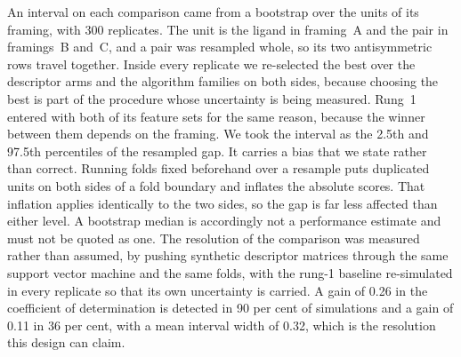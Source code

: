 An interval on each comparison came from a bootstrap over the units of its framing,
with 300 replicates. The unit is the ligand in framing~A and the pair in framings~B
and~C, and a pair was resampled whole, so its two antisymmetric rows travel together.
Inside every replicate we re-selected the best over the descriptor arms and the
algorithm families on both sides, because choosing the best is part of the procedure
whose uncertainty is being measured. Rung~1 entered with both of its feature sets for
the same reason, because the winner between them depends on the framing. We took the
interval as the 2.5th and 97.5th percentiles of the resampled gap. It carries a bias
that we state rather than correct. Running folds fixed beforehand over a resample puts
duplicated units on both sides of a fold boundary and inflates the absolute scores.
That inflation applies identically to the two sides, so the gap is far less affected
than either level. A bootstrap median is accordingly not a performance estimate and
must not be quoted as one. The resolution of the comparison was measured rather than
assumed, by pushing synthetic descriptor matrices through the same support vector
machine and the same folds, with the rung-1 baseline re-simulated in every replicate so
that its own uncertainty is carried. A gain of 0.26 in the coefficient of determination
is detected in 90 per cent of simulations and a gain of 0.11 in 36 per cent, with a
mean interval width of 0.32, which is the resolution this design can claim.
